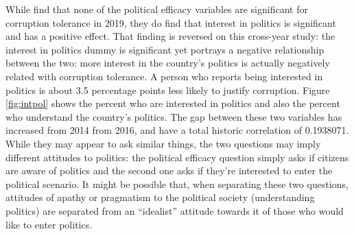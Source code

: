 \documentclass[floatsintext,man]{apa7}\usepackage[]{graphicx}\usepackage[]{color}
\begin{document}
While \textcite{Moscoso.2020} find that none of the political efficacy variables are significant for corruption tolerance in 2019, they do find that interest in politics is significant and has a positive effect. That finding is reversed on this cross-year study: the interest in politics dummy is significant yet portrays a negative relationship between the two: more interest in the country's politics is actually negatively related with corruption tolerance. A person who reports being interested in politics is about 3.5 percentage points less likely to justify corruption. Figure \ref{fig:intpol} shows the percent who are interested in politics and also the percent who understand the country's politics. The gap between these two variables has increased from 2014 from 2016, and have a total historic correlation of 0.1938071. While they may appear to ask similar things, the two questions may imply different attitudes to politics: the political efficacy question simply asks if citizens are aware of politics and the second one asks if they're interested to enter the political scenario. It might be possible that, when separating these two questions, attitudes of apathy or pragmatism to the political society (understanding politics) are separated from an \enquote{idealist} attitude towards it of those who would like to enter politics. 
\end{document}
